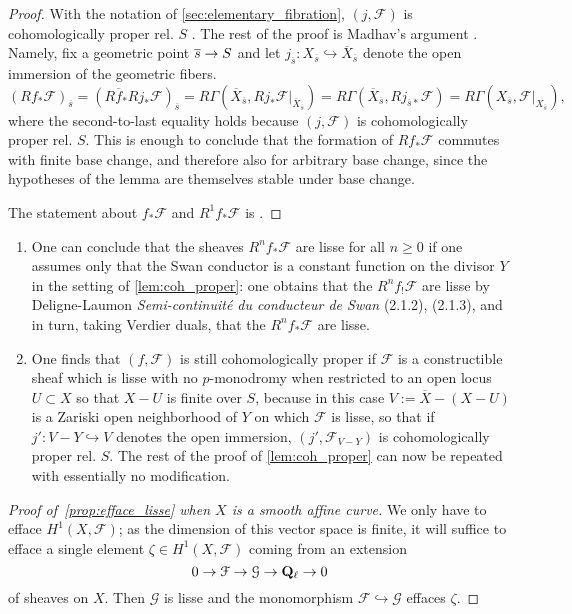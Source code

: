 \documentclass[deligne.tex]{subfiles}
\begin{document}
\begin{proof}
With the notation of \eqref{sec:elementary_fibration}, $(j,\mathcal F)$
is cohomologically proper rel. $S$ \cite[1.3.3]{Illusie}. The rest of the
proof is Madhav's argument \cite[1.3A]{Nori}. Namely, fix a geometric point
$\overline s\rightarrow S$ and let
$j_{\overline s}:X_{\overline s}\hookrightarrow\overline X_{\overline s}$
denote the open immersion of the geometric fibers.
\begin{equation*}
	(Rf_*\mathcal F)_{\overline s}
	=(R\overline f_*Rj_*\mathcal F)_{\overline s}
	=R\Gamma(\overline X_{\overline s},Rj_*\mathcal F|_{\overline X_{\overline s}})
	=R\Gamma(\overline X_{\overline s},Rj_{\overline s*}\mathcal F)
	=R\Gamma(X_{\overline s},\mathcal F|_{X_{\overline s}}),
\end{equation*}
where the second-to-last equality holds because $(j,\mathcal F)$ is
cohomologically proper rel. $S$.
This is enough to conclude that the formation of $Rf_*\mathcal F$ commutes
with finite base change, and therefore also for arbitrary base change, since
the hypotheses of the lemma are themselves stable under base change.

The statement about $f_*\mathcal F$ and $R^1f_*\mathcal F$ is
\cite[XIII 1.14, 1.16]{SGA1}.
\end{proof}
\begin{remark}\begin{enumerate}
	\item One can conclude that the sheaves $R^nf_*\mathcal F$ are lisse for
	all $n\geq0$ if one assumes only that the Swan conductor is a constant
	function on the divisor $Y$ in the setting of \eqref{lem:coh_proper}:
	one obtains that the $R^nf_!\mathcal F$ are lisse by Deligne-Laumon
	\emph{Semi-continuité du conducteur de Swan} (2.1.2), (2.1.3),
	and in turn, taking Verdier duals, that the $R^nf_*\mathcal F$ are lisse.
	\item One finds that $(f,\mathcal F)$ is still cohomologically proper
	if $\mathcal F$ is a constructible sheaf which is lisse with no
	$p$-monodromy when restricted to an open locus
	$U\subset X$ so that $X-U$ is finite over $S$, because in this case
	$V:=\overline X-(X-U)$ is a Zariski open neighborhood of $Y$ on which
	$\mathcal F$ is lisse, so that if $j':V-Y\hookrightarrow V$ denotes the
	open immersion, $(j',\mathcal F_{V-Y})$ is cohomologically proper rel. 
	$S$. The rest of the proof of \eqref{lem:coh_proper} can now be repeated
	with essentially no modification.
\end{enumerate}
\end{remark}
\begin{proof}[Proof of~\eqref{prop:efface_lisse} when $X$ is a smooth affine curve]
We only have to efface $H^1(X,\mathcal F)$; as the dimension of this vector
space is finite, it will suffice to efface a single element
$\zeta\in H^1(X,\mathcal F)$ coming from an extension
\begin{equation*}
	0\rightarrow\mathcal F\rightarrow\mathcal G\rightarrow\mathbf{Q}_\ell\rightarrow0
\end{equation*}
of sheaves on $X$. Then $\mathcal G$ is lisse and
the monomorphism $\mathcal F\hookrightarrow\mathcal G$ effaces $\zeta$.
\end{proof}
\end{document}
